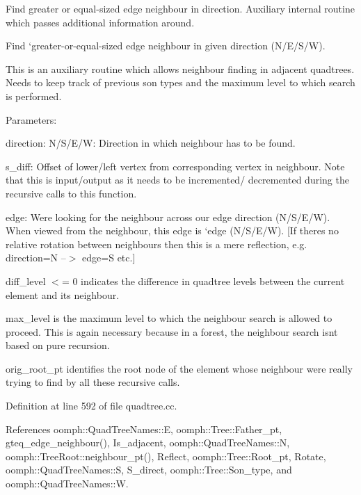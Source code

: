 Find greater or equal-\/sized edge neighbour in direction. Auxiliary internal routine which passes additional information around. 

Find `greater-\/or-\/equal-\/sized edge neighbour\textquotesingle{} in given direction (N/\+E/\+S/W).

This is an auxiliary routine which allows neighbour finding in adjacent quadtrees. Needs to keep track of previous son types and the maximum level to which search is performed.

Parameters\+:


\begin{DoxyItemize}
\item direction\+: N/\+S/\+E/W\+: Direction in which neighbour has to be found.
\item s\+\_\+diff\+: Offset of lower/left vertex from corresponding vertex in neighbour. Note that this is input/output as it needs to be incremented/ decremented during the recursive calls to this function.
\item edge\+: We\textquotesingle{}re looking for the neighbour across our edge \textquotesingle{}direction\textquotesingle{} (N/\+S/\+E/W). When viewed from the neighbour, this edge is `edge\textquotesingle{} (N/\+S/\+E/W). \mbox{[}If there\textquotesingle{}s no relative rotation between neighbours then this is a mere reflection, e.\+g. direction=N --$>$ edge=S etc.\mbox{]}
\item diff\+\_\+level $<$= 0 indicates the difference in quadtree levels between the current element and its neighbour.
\item max\+\_\+level is the maximum level to which the neighbour search is allowed to proceed. This is again necessary because in a forest, the neighbour search isn\textquotesingle{}t based on pure recursion.
\item orig\+\_\+root\+\_\+pt identifies the root node of the element whose neighbour we\textquotesingle{}re really trying to find by all these recursive calls. 
\end{DoxyItemize}

Definition at line 592 of file quadtree.\+cc.



References oomph\+::\+Quad\+Tree\+Names\+::E, oomph\+::\+Tree\+::\+Father\+\_\+pt, gteq\+\_\+edge\+\_\+neighbour(), Is\+\_\+adjacent, oomph\+::\+Quad\+Tree\+Names\+::N, oomph\+::\+Tree\+Root\+::neighbour\+\_\+pt(), Reflect, oomph\+::\+Tree\+::\+Root\+\_\+pt, Rotate, oomph\+::\+Quad\+Tree\+Names\+::S, S\+\_\+direct, oomph\+::\+Tree\+::\+Son\+\_\+type, and oomph\+::\+Quad\+Tree\+Names\+::W.

